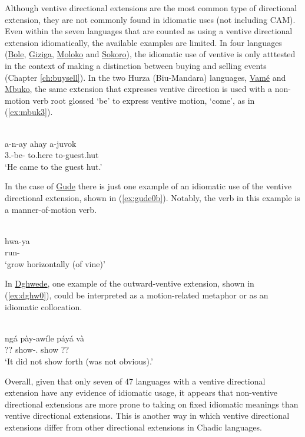 Although ventive directional extensions are the most common type of directional extension, they are not commonly found in idiomatic uses (not including CAM). Even within the seven languages that are counted as using a ventive directional extension idiomatically, the available examples are limited. In four languages (\hyperref[bole]{Bole}, \hyperref[gizi]{Giziga}, \hyperref[molo]{Moloko} and \hyperref[soko]{Sokoro}), the idiomatic use of ventive is only atttested in the context of making a distinction between buying and selling events (Chapter \ref{ch:buysell}). In the two Hurza (Biu-Mandara) languages, \hyperref[vame]{Vamé} and \hyperref[mbuk]{Mbuko}, the same extension that expresses ventive direction is used with a non-motion verb root glossed `be' to express ventive motion, `come', as in (\ref{ex:mbuk3}). 

\ea\label{ex:mbuk3}
 \\
\gll a-n-ay ahay a-juvok \\	
3.-be- to.here to-guest.hut	\\
\glt `He came to the guest hut.'
\z 

In the case of \hyperref[gude]{Gude} there is just one example of an idiomatic use of the ventive directional extension, shown in (\ref{ex:gude0b}). Notably, the verb in this example is a manner-of-motion verb. 

\ea\label{ex:gude0b}
 \\
\gll hwa-ya	\\ 
run-	\\ 
\glt `grow horizontally (of vine)'
\z 

In \hyperref[dghw]{Dghwede}, one example of the outward-ventive extension, shown in (\ref{ex:dghw0}), could be interpreted as a motion-related metaphor or as an idiomatic collocation. 

\ea\label{ex:dghw0}
 \\
\gll ngá pày-awíle páyá và	\\
?? show-. show ??	\\
\glt `It did not show forth (was not obvious).'
\z 

Overall, given that only seven of 47 languages with a ventive directional extension have any evidence of idiomatic usage, it appears that non-ventive directional extensions are more prone to taking on fixed idiomatic meanings than ventive directional extensions. This is another way in which ventive directional extensions differ from other directional extensions in Chadic languages. 

